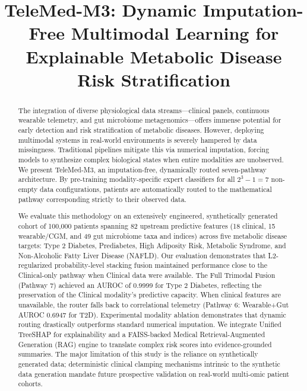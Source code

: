 \documentclass[journal, twocolumn]{IEEEtran}
\begin{document}
\title{TeleMed-M3: Dynamic Imputation-Free Multimodal Learning for Explainable Metabolic Disease Risk Stratification}
\author{}
\maketitle

\begin{abstract}
The integration of diverse physiological data streams—clinical panels, continuous wearable telemetry, and gut microbiome metagenomics—offers immense potential for early detection and risk stratification of metabolic diseases. However, deploying multimodal systems in real-world environments is severely hampered by data missingness. Traditional pipelines mitigate this via numerical imputation, forcing models to synthesize complex biological states when entire modalities are unobserved. We present TeleMed-M3, an imputation-free, dynamically routed seven-pathway architecture. By pre-training modality-specific expert classifiers for all $2^3 - 1 = 7$ non-empty data configurations, patients are automatically routed to the mathematical pathway corresponding strictly to their observed data. 

We evaluate this methodology on an extensively engineered, synthetically generated cohort of 100,000 patients spanning 82 upstream predictive features (18 clinical, 15 wearable/CGM, and 49 gut microbiome taxa and indices) across five metabolic disease targets: Type 2 Diabetes, Prediabetes, High Adiposity Risk, Metabolic Syndrome, and Non-Alcoholic Fatty Liver Disease (NAFLD). Our evaluation demonstrates that L2-regularized probability-level stacking fusion maintained performance close to the Clinical-only pathway when Clinical data were available. The Full Trimodal Fusion (Pathway 7) achieved an AUROC of 0.9999 for Type 2 Diabetes, reflecting the preservation of the Clinical modality's predictive capacity. When clinical features are unavailable, the router falls back to correlational telemetry (Pathway 6: Wearable+Gut AUROC 0.6947 for T2D). Experimental modality ablation demonstrates that dynamic routing drastically outperforms standard numerical imputation. We integrate Unified TreeSHAP for explainability and a FAISS-backed Medical Retrieval-Augmented Generation (RAG) engine to translate complex risk scores into evidence-grounded summaries. The major limitation of this study is the reliance on synthetically generated data; deterministic clinical clamping mechanisms intrinsic to the synthetic data generation mandate future prospective validation on real-world multi-omic patient cohorts.
\end{abstract}
\end{document}
